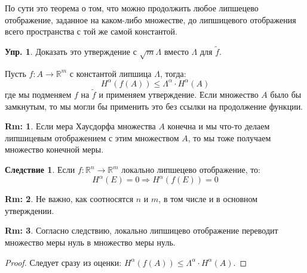 \documentclass[12pt]{article}
\newcommand{\MR}{\mathbb{R}}
\theoremstyle{definition}
\newtheorem{rem}{Rm:}
\newtheorem{exrc}{Упр.}
\newtheorem{corollary}{Следствие}
\newcommand{\wte}[1]{\widetilde{#1}}
\begin{document}
По сути это теорема о том, что можно продолжить любое липшецево отображение, заданное на каком-либо множестве, до липшицевого отображения всего пространства с той же самой константой.
\begin{exrc}
	Доказать это утверждение с $\sqrt{m}\Lambda$ вместо $\Lambda$ для $\wte{f}$.
\end{exrc}
Пусть $f \colon A \to \MR^m$ с константой липшица $\Lambda$, тогда:
$$
	H^\alpha(f(A)) \leq \Lambda^\alpha{\cdot}H^\alpha(A)
$$
где мы подменяем $f$ на $\wte{f}$ и применяем утверждение. Если множество $A$ было бы замкнутым, то мы могли бы применить это без ссылки на продолжение функции.
\begin{rem}
	Если мера Хаусдорфа множества $A$ конечна и мы что-то делаем липшицевым отображением с этим множеством $A$, то мы тоже получаем множество конечной меры.
\end{rem}

\begin{corollary}
	Если $f \colon \MR^n \to \MR^m$ локально липшецево отображение, то:
	$$
		H^\alpha(E) = 0 \Rightarrow H^\alpha(f(E)) = 0
	$$
\end{corollary}
\begin{rem}
	Не важно, как соотносятся $n$ и $m$, в том числе и в основном утверждении.
\end{rem}
\begin{rem}
	Согласно следствию, локально липшицево отображение переводит множество меры нуль в множество меры нуль.
\end{rem}
\begin{proof}
	Следует сразу из оценки: $H^\alpha(f(A)) \leq \Lambda^\alpha{\cdot}H^\alpha(A)$.
\end{proof}
\end{document}
